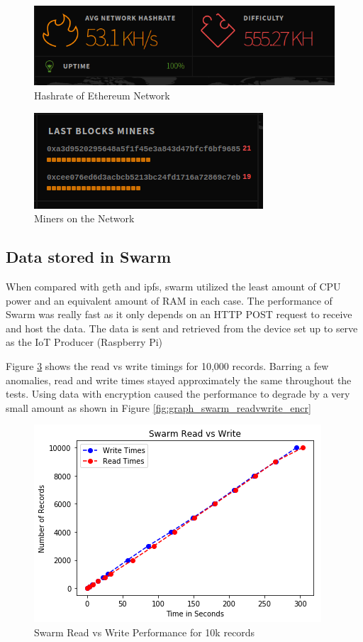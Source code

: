\documentclass[11pt,openright]{report}
\begin{document}
\begin{figure}
    \centering
    \includegraphics[scale=1]{results/hashrate.png}
    \caption{Hashrate of Ethereum Network}
    \label{fig:eth_hashrate}
\end{figure}

\begin{figure}
    \centering
    \includegraphics[scale=1]{results/miners.png}
    \caption{Miners on the Network}
    \label{fig:eth_miners}
\end{figure}

\subsection{Data stored in Swarm}
When compared with geth and ipfs, swarm utilized the least amount of CPU power and an equivalent amount of RAM in each case. The performance of Swarm was really fast as it only depends on an HTTP POST request to receive and host the data. The data is sent and retrieved from the device set up to serve as the IoT Producer (Raspberry Pi)

Figure \ref{fig:graph_swarm_readvwrite} shows the read vs write timings for 10,000 records. Barring a few anomalies, read and write times stayed approximately the same throughout the tests.
Using data with encryption caused the performance to degrade by a very small amount as shown in Figure \ref{fig:graph_swarm_readvwrite_encr}

\begin{figure}
    \centering
    \includegraphics[scale=1]{results/graphs/Swarm_Read_v_Write.png}
    \caption{Swarm Read vs Write Performance for 10k records}
    \label{fig:graph_swarm_readvwrite}
\end{figure}
\end{document}
